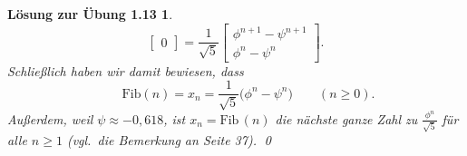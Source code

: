 \documentclass[a4paper,11pt,reqno]{amsart}
\theoremstyle{uremark}
\newtheorem*{loes}{L\"osung zur \"Ubung 1.13}
\begin{document}
\begin{loes}
\begin{equation*}
\begin{bmatrix}
            0  
        \end{bmatrix} = \frac{1}{\sqrt{5}}\begin{bmatrix}
            \phi^{n + 1} - \psi^{n + 1} \\
            \phi^n - \psi^n
        \end{bmatrix}.
    \end{equation*}
    Schlie\ss lich haben wir damit bewiesen, dass
    \begin{equation*}%
        \qquad \boxed{\text{Fib}(n) = x_n = \frac{1}{\sqrt{5}}\big( \phi^n -
        \psi^n \big)}\qquad (n \ge 0).
    \end{equation*}
    Au\ss erdem, weil $ \psi \approx -0,618 $, ist $ x_n = \text{Fib}\,(n) $
    die n\"achste ganze Zahl zu $ \frac{\phi^n}{\sqrt{5}} $ f\"ur alle $ n \ge
    1$ (vgl.~die Bemerkung an Seite 37).  \qed
\end{loes}
\end{document}
